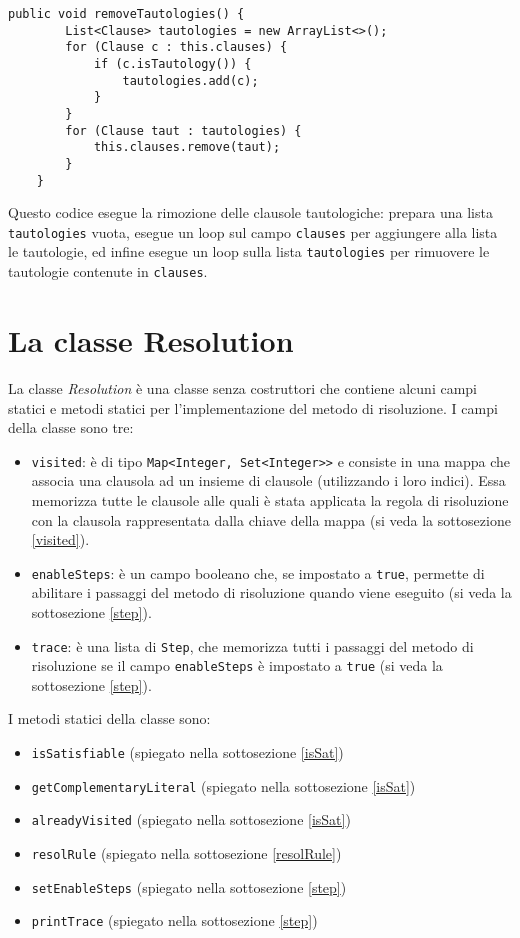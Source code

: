 \documentclass[a4paper,12pt]{report}
\begin{document}
\begin{lstlisting}[caption={Metodo ``removeTautologies'' della classe ClauseSet}, label={remtaut}]
    public void removeTautologies() {
        List<Clause> tautologies = new ArrayList<>();
        for (Clause c : this.clauses) {
            if (c.isTautology()) {
                tautologies.add(c);
            }
        }
        for (Clause taut : tautologies) {
            this.clauses.remove(taut);
        }
    }
\end{lstlisting}
Questo codice esegue la rimozione delle clausole tautologiche: prepara una lista \texttt{tautologies} vuota, esegue un loop sul campo \texttt{clauses} per aggiungere alla lista le tautologie, ed infine esegue un loop sulla lista \texttt{tautologies} per rimuovere le tautologie contenute in \texttt{clauses}.

\section{La classe Resolution}
La classe \textit{Resolution} è una classe senza costruttori che contiene alcuni campi statici e metodi statici per l'implementazione del metodo di risoluzione. I campi della classe sono tre:
\begin{itemize}
    \item \texttt{visited}: è di tipo \texttt{Map<Integer, Set<Integer>>} e consiste in una mappa che associa una clausola ad un insieme di clausole (utilizzando i loro indici). Essa memorizza tutte le clausole alle quali è stata applicata la regola di risoluzione con la clausola rappresentata dalla chiave della mappa (si veda la sottosezione \ref{visited}).
    \item \texttt{enableSteps}: è un campo booleano che, se impostato a \texttt{true}, permette di abilitare i passaggi del metodo di risoluzione quando viene eseguito (si veda la sottosezione \ref{step}).
    \item \texttt{trace}: è una lista di \texttt{Step}, che memorizza tutti i passaggi del metodo di risoluzione se il campo \texttt{enableSteps} è impostato a \texttt{true} (si veda la sottosezione \ref{step}).
\end{itemize}

I metodi statici della classe sono:
\begin{itemize}
    \item \texttt{isSatisfiable} (spiegato nella sottosezione \ref{isSat})
    \item \texttt{getComplementaryLiteral} (spiegato nella sottosezione \ref{isSat})
    \item \texttt{alreadyVisited} (spiegato nella sottosezione \ref{isSat})
    \item \texttt{resolRule} (spiegato nella sottosezione \ref{resolRule})
    \item \texttt{setEnableSteps} (spiegato nella sottosezione \ref{step})
    \item \texttt{printTrace} (spiegato nella sottosezione \ref{step})
\end{itemize}
\end{document}
